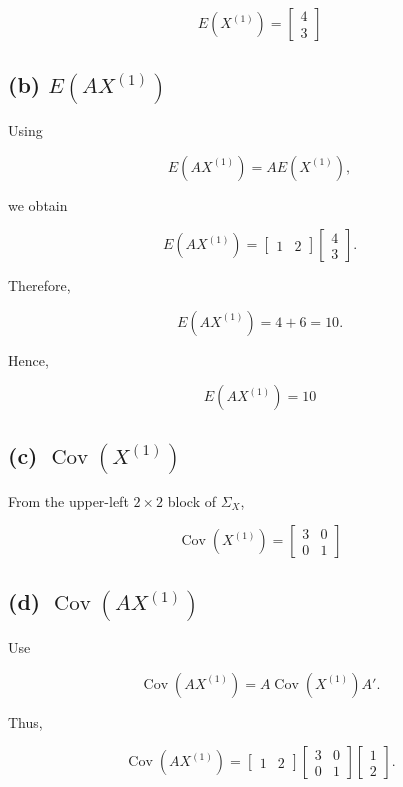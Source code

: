 \documentclass[12pt]{article}
\begin{document}
\[
\boxed{
E(X^{(1)})
=
\begin{bmatrix}
4\\
3
\end{bmatrix}}
\]

\subsection*{(b) $E(AX^{(1)})$}

Using

\[
E(AX^{(1)})
=
AE(X^{(1)}),
\]

we obtain

\[
E(AX^{(1)})
=
\begin{bmatrix}
1&2
\end{bmatrix}
\begin{bmatrix}
4\\
3
\end{bmatrix}.
\]

Therefore,

\[
E(AX^{(1)})
=
4+6
=
10.
\]

Hence,

\[
\boxed{
E(AX^{(1)})=10
}
\]

\subsection*{(c) $\operatorname{Cov}(X^{(1)})$}

From the upper-left $2\times2$ block of $\Sigma_X$,

\[
\boxed{
\operatorname{Cov}(X^{(1)})
=
\begin{bmatrix}
3&0\\
0&1
\end{bmatrix}}
\]

\subsection*{(d) $\operatorname{Cov}(AX^{(1)})$}

Use

\[
\operatorname{Cov}(AX^{(1)})
=
A\operatorname{Cov}(X^{(1)})A'.
\]

Thus,

\[
\operatorname{Cov}(AX^{(1)})
=
\begin{bmatrix}
1&2
\end{bmatrix}
\begin{bmatrix}
3&0\\
0&1
\end{bmatrix}
\begin{bmatrix}
1\\
2
\end{bmatrix}.
\]
\end{document}

